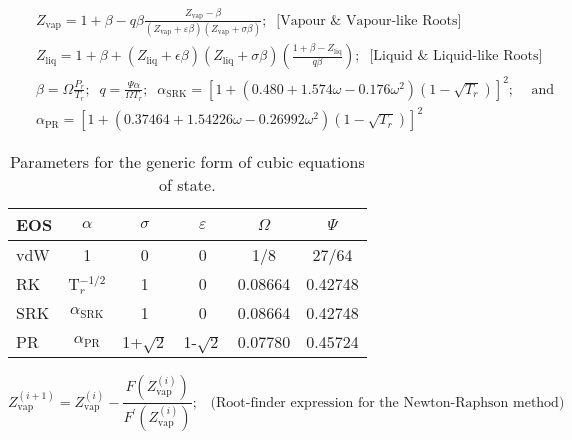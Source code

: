 \documentclass[12pts,a4paper,amsmath,amssymb,floatfix]{article}%
\newcommand{\frc}{\displaystyle\frac}
\begin{document}
\begin{enumerate}[1.]
\begin{eqnarray}
    && Z_{\text{vap}} = 1 + \beta - q\beta \frc{Z_{\text{vap}} - \beta} {\left(Z_{\text{vap}}+\varepsilon\beta\right)\left(Z_{\text{vap}} +\sigma\beta\right)};\;\;\text{[Vapour $\&$ Vapour-like Roots]} \nonumber \\
    && Z_{\text{liq}} = 1 + \beta + \left(Z_{\text{liq}} + \epsilon\beta\right)\left(Z_{\text{liq}}+\sigma\beta\right)\left(\frc{1+\beta-Z_{\text{liq}}}{q\beta}\right);\;\;\text{[Liquid $\&$ Liquid-like Roots]} \nonumber \\
    && \beta=\Omega\frc{P_{r}}{T_{r}};\;\; q=\frc{\Psi\alpha}{\Omega T_{r}};\;\;\alpha_{\text{SRK}} = \left[ 1 + \left( 0.480 + 1.574 \omega - 0.176\omega^{2}\right)\left(1-\sqrt{T_{r}}\right)\right]^{2};\;\;\;\text{ and } \nonumber \\
    && \alpha_{\text{PR}} = \left[ 1 + \left( 0.37464 + 1.54226 \omega - 0.26992\omega^{2}\right)\left(1-\sqrt{T_{r}}\right)\right]^{2} \nonumber
  \end{eqnarray}

\begin{table}[h]
    \begin{center}
       \begin{tabular}{| l | c c c c c| }
       \hline
          {\bf EOS}  & {\bf $\alpha$} & {\bf $\sigma$}  & {\bf $\varepsilon$} & {\bf $\Omega$} & {\bf $\Psi$ } \\
       \hline
            vdW      & 1              & 0               & 0                  & 1/8            & 27/64          \\
            RK       & T$_{r}^{-1/2}$  & 1                & 0                  & 0.08664       & 0.42748        \\
           SRK       &$\alpha_{\text{SRK}}$& 1            & 0                   & 0.08664       & 0.42748        \\
            PR       &$\alpha_{\text{PR}}$& 1+$\sqrt{2}$   & 1-$\sqrt{2}$        & 0.07780        & 0.45724  \\
       \hline
       \end{tabular}
  \caption{Parameters for the generic form of cubic equations of state.}
  \end{center}
\end{table}

\begin{displaymath}
  Z_{\text{vap}}^{(i+1)} = Z_{\text{vap}}^{(i)} - \frc{F\left(Z_{\text{vap}}^{(i)}\right)}{F^{\prime}\left(Z_{\text{vap}}^{(i)}\right)};\;\;\;\text{(Root-finder expression for the Newton-Raphson method)}
\end{displaymath}



\end{enumerate}
\end{document}
